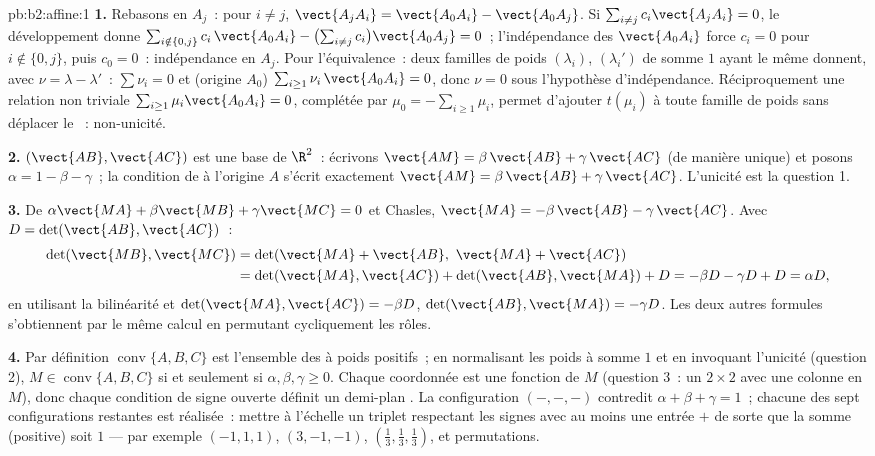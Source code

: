 \begin{solution}{pb:b2:affine:1}
\textbf{1.} Rebasons en $A_j$~: pour $i \neq j$, $\vect{A_jA_i} =
\vect{A_0A_i} - \vect{A_0A_j}$. Si $\sum_{i \neq j}
c_i\vect{A_jA_i} = 0$, le développement donne $\sum_{i \notin \{0,
j\}} c_i\,\vect{A_0A_i} - \bigl(\sum_{i\neq j}
c_i\bigr)\vect{A_0A_j} = 0$~; l'indépendance des
$\vect{A_0A_i}$ force $c_i = 0$ pour $i \notin \{0, j\}$, puis
$c_0 = 0$~: indépendance en $A_j$. Pour l'équivalence~: deux
familles de poids $(\lambda_i)$, $(\lambda_i')$ de somme $1$
ayant le même  donnent, avec $\nu = \lambda -
\lambda'$~: $\sum\nu_i = 0$ et (origine $A_0$) $\sum_{i \geq
1}\nu_i\,\vect{A_0A_i} = 0$, donc $\nu = 0$ sous l'hypothèse
d'indépendance. Réciproquement une relation non triviale
$\sum_{i\geq1}\mu_i \vect{A_0A_i} = 0$, complétée par $\mu_0 =
-\sum_{i\geq1} \mu_i$, permet d'ajouter $t(\mu_i)$ à toute famille de
poids sans déplacer le ~: non-unicité.

\textbf{2.} $(\vect{AB}, \vect{AC})$ est une base de $\R^2$~:
écrivons $\vect{AM} = \beta\,\vect{AB} + \gamma\,\vect{AC}$
(de manière unique) et posons $\alpha = 1 - \beta - \gamma$~; la
condition de  à l'origine $A$ s'écrit exactement $\vect{AM} =
\beta\,\vect{AB} + \gamma\,\vect{AC}$. L'unicité est la question
1.

\textbf{3.} De $\alpha\vect{MA} + \beta\vect{MB} +
\gamma\vect{MC} = 0$ et Chasles, $\vect{MA} =
-\beta\,\vect{AB} - \gamma\,\vect{AC}$. Avec $D =
\det(\vect{AB}, \vect{AC})$~:
\begin{align*}
\det(\vect{MB}, \vect{MC})
&= \det(\vect{MA} + \vect{AB},\ \vect{MA} + \vect{AC})\\
&= \det(\vect{MA}, \vect{AC}) + \det(\vect{AB}, \vect{MA}) +
D = -\beta D - \gamma D + D = \alpha D,
\end{align*}
en utilisant la bilinéarité et $\det(\vect{MA}, \vect{AC}) = -\beta D$,
$\det(\vect{AB}, \vect{MA}) = -\gamma D$. Les deux autres
formules s'obtiennent par le même calcul en permutant cycliquement les
rôles.

\textbf{4.} Par définition $\operatorname{conv}\{A, B, C\}$ est
l'ensemble des  à poids positifs~; en normalisant
les poids à somme $1$ et en invoquant l'unicité (question 2),
$M \in \operatorname{conv}\{A,B,C\}$ si et seulement si $\alpha, \beta,
\gamma \geq 0$. Chaque coordonnée est une fonction  de $M$
(question 3~: un  $2\times2$ avec une colonne 
en $M$), donc chaque condition de signe ouverte définit un
demi-plan . La configuration $(-,-,-)$ contredit $\alpha + \beta
+ \gamma = 1$~; chacune des sept configurations restantes est
réalisée~: mettre à l'échelle un triplet respectant les signes avec au
moins une entrée $+$ de sorte que la somme (positive) soit $1$ ---
par exemple $(-1, 1, 1)$, $(3, -1, -1)$, $(\frac13, \frac13, \frac13)$,
et permutations.


\end{solution}
